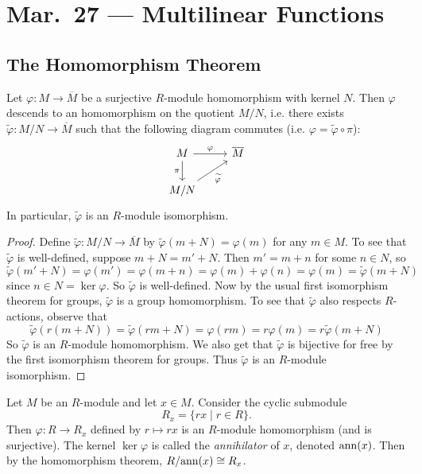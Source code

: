 \chapter{Mar.~27 --- Multilinear Functions}

\section{The Homomorphism Theorem}
\begin{theorem}
  Let $\varphi : M \to \overline{M}$ be a surjective
  $R$-module homomorphism with kernel $N$. Then
  $\varphi$ descends to an homomorphism on the
  quotient $M / N$, i.e. there exists
  $\widetilde{\varphi} : M / N \to \overline{M}$
  such that the following diagram commutes (i.e.
  $\varphi = \widetilde{\varphi} \circ \pi$):
  \[
    \begin{tikzcd}
      M \ar[r, "\varphi"] \ar[d, "\pi", swap] & \overline{M} \\
      M / N \ar[ur, "\widetilde{\varphi}"'] &
    \end{tikzcd}
  \]
  In particular, $\widetilde{\varphi}$ is an
  $R$-module isomorphism.
\end{theorem}

\begin{proof}
  Define $\widetilde{\varphi} : M / N \to \overline{M}$
  by $\widetilde{\varphi}(m + N) = \varphi(m)$ for
  any $m \in M$. To see that $\widetilde{\varphi}$
  is well-defined, suppose $m + N = m' + N$. Then
  $m' = m + n$ for some $n \in N$, so
  \[
    \widetilde{\varphi}(m' + N) = \varphi(m')
    = \varphi(m + n) = \varphi(m) + \varphi(n)
    = \varphi(m) = \widetilde{\varphi}(m + N)
  \]
  since $n \in N = \ker \varphi$. So $\widetilde{\varphi}$
  is well-defined. Now by the usual first isomorphism
  theorem for groups, $\widetilde{\varphi}$ is a
  group homomorphism. To see that
  $\widetilde{\varphi}$ also respects $R$-actions,
  observe that
  \[
    \widetilde{\varphi}(r(m + N))
    = \widetilde{\varphi}(rm + N)
    = \varphi(rm)
    = r\varphi(m)
    = r\widetilde{\varphi}(m + N)
  \]
  So $\widetilde{\varphi}$ is an $R$-module homomorphism.
  We also get that $\widetilde{\varphi}$ is bijective for
  free by the first isomorphism theorem for groups.
  Thus $\widetilde{\varphi}$ is an $R$-module isomorphism.
\end{proof}

\begin{example}
  Let $M$ be an $R$-module and let $x \in M$.
  Consider the cyclic submodule
  \[
    R_x = \{rx \mid r \in R\}.
  \]
  Then $\varphi : R \to R_x$ defined by
  $r \mapsto rx$ is an $R$-module homomorphism (and is
  surjective). The
  kernel $\ker \varphi$ is called the \emph{annihilator}
  of $x$, denoted $\operatorname{ann}(x)$. Then by the homomorphism
  theorem, $R / {\operatorname{ann}(x)} \cong R_x$.
\end{example}

